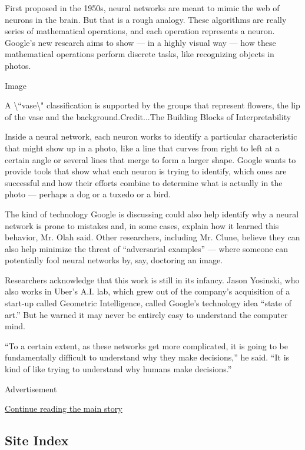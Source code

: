 First proposed in the 1950s, neural networks are meant to mimic the web
of neurons in the brain. But that is a rough analogy. These algorithms
are really series of mathematical operations, and each operation
represents a neuron. Google's new research aims to show --- in a highly
visual way --- how these mathematical operations perform discrete tasks,
like recognizing objects in photos.

Image

A \textbackslash{}``vase\textbackslash{}" classification is supported by
the groups that represent flowers, the lip of the vase and the
background.Credit...The Building Blocks of Interpretability

Inside a neural network, each neuron works to identify a particular
characteristic that might show up in a photo, like a line that curves
from right to left at a certain angle or several lines that merge to
form a larger shape. Google wants to provide tools that show what each
neuron is trying to identify, which ones are successful and how their
efforts combine to determine what is actually in the photo --- perhaps a
dog or a tuxedo or a bird.

The kind of technology Google is discussing could also help identify why
a neural network is prone to mistakes and, in some cases, explain how it
learned this behavior, Mr. Olah said. Other researchers, including Mr.
Clune, believe they can also help minimize the threat of ``adversarial
examples'' --- where someone can potentially fool neural networks by,
say, doctoring an image.

Researchers acknowledge that this work is still in its infancy. Jason
Yosinski, who also works in Uber's A.I. lab, which grew out of the
company's acquisition of a start-up called Geometric Intelligence,
called Google's technology idea ``state of art.'' But he warned it may
never be entirely easy to understand the computer mind.

``To a certain extent, as these networks get more complicated, it is
going to be fundamentally difficult to understand why they make
decisions,'' he said. ``It is kind of like trying to understand why
humans make decisions.''

Advertisement

\protect\hyperlink{after-bottom}{Continue reading the main story}

\hypertarget{site-index}{%
\subsection{Site Index}\label{site-index}}

